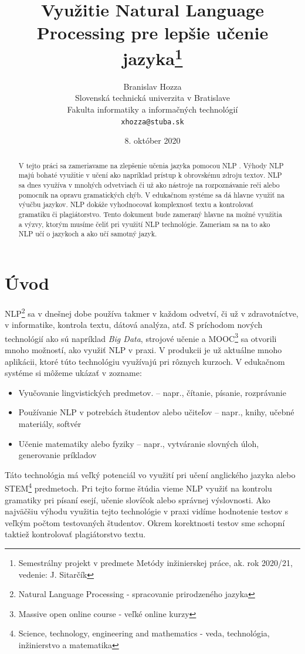 \documentclass[10pt,slovak,a4paper,twoside]{article}
\title{Využitie Natural Language Processing pre lepšie učenie jazyka\thanks{Semestrálny projekt v predmete Metódy inžinierskej práce, ak. rok 2020/21, vedenie: J. Sitarčík}}
\author{Branislav Hozza\\[2pt]
	{\small Slovenská technická univerzita v Bratislave}\\
	{\small Fakulta informatiky a informačných technológií}\\
	{\small \texttt{xhozza@stuba.sk}}
	}
\date{\small 8. október 2020}
\begin{document}
\maketitle
\begin{abstract}
	V tejto práci sa zameriavame na zlepšenie učenia jazyka pomocou NLP \cite{litman2016natural}. 
	Výhody NLP majú bohaté využitie v učení ako napríklad prístup k obrovskému zdroju textov. 
	NLP sa dnes využíva v mnohých odvetviach či už ako nástroje na rozpoznávanie reči alebo pomocník na opravu gramatických chýb. 
	V edukačnom systéme sa dá hlavne využiť na výučbu jazykov. NLP dokáže vyhodnocovať komplexnosť textu a kontrolovať gramatiku či plagiátorstvo. 
	Tento dokument bude zameraný hlavne na možné využitia a výzvy, ktorým musíme čeliť pri využití NLP technológie. 
	Zameriam sa na to ako NLP učí o jazykoch a ako učí samotný jazyk.
\end{abstract}
\section{Úvod}\label{uvod}
NLP\footnote{Natural Language Processing - spracovanie prirodzeného jazyka} sa v dnešnej dobe používa takmer v každom odvetví, či už v zdravotníctve, 
v informatike, kontrola textu, dátová analýza, atď. S príchodom nových technológií ako sú napríklad \textit{Big Data}, strojové učenie a 
MOOC\footnote{Massive open online course - veľké online kurzy} sa otvorili mnoho možností, ako využiť NLP v praxi. 
V produkcii je už aktuálne mnoho aplikácii, ktoré túto technológiu využívajú pri rôznych kurzoch.
V edukačnom systéme si môžeme ukázať v zozname:
\begin{itemize}
	\item Vyučovanie lingvistických predmetov.
	– napr., čítanie, písanie, rozprávanie
	\item Používanie NLP v potrebách študentov alebo učiteľov
	– napr., knihy, učebné materiály, softvér
	\item Učenie matematiky alebo fyziky
	– napr., vytváranie slovných úloh, generovanie príkladov
\end{itemize}

Táto technológia má veľký potenciál vo využití pri učení anglického jazyka 
alebo STEM\footnote{Science, technology, engineering and mathematics - veda, technológia, inžinierstvo a matematika} predmetoch. 
Pri tejto forme štúdia vieme NLP využiť na kontrolu gramatiky pri písaní esejí, učenie slovíčok alebo správnej výslovnosti.
Ako najväčšiu výhodu využitia tejto technológie v praxi vidíme hodnotenie testov s veľkým počtom testovaných študentov. 
Okrem korektnosti testov sme schopní taktiež kontrolovať plagiátorstvo textu.
\end{document}
